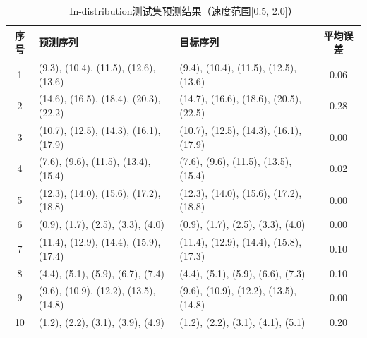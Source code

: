 \documentclass[a4paper, 12pt]{article}
\begin{document}
\begin{table}[!h]
    \centering
    \caption{In-distribution测试集预测结果（速度范围[0.5, 2.0]）}
    \label{tab:in_dist_results}
    \small
    \begin{tabular}{|c|l|l|c|}
        \hline
        \textbf{序号} & \textbf{预测序列} & \textbf{目标序列} & \textbf{平均误差} \\
        \hline
        1 & (9.3), (10.4), (11.5), (12.6), (13.6) & (9.4), (10.4), (11.5), (12.5), (13.6) & 0.06 \\
        2 & (14.6), (16.5), (18.4), (20.3), (22.2) & (14.7), (16.6), (18.6), (20.5), (22.5) & 0.28 \\
        3 & (10.7), (12.5), (14.3), (16.1), (17.9) & (10.7), (12.5), (14.3), (16.1), (17.9) & 0.00 \\
        4 & (7.6), (9.6), (11.5), (13.4), (15.4) & (7.6), (9.6), (11.5), (13.5), (15.4) & 0.02 \\
        5 & (12.3), (14.0), (15.6), (17.2), (18.8) & (12.3), (14.0), (15.6), (17.2), (18.8) & 0.00 \\
        6 & (0.9), (1.7), (2.5), (3.3), (4.0) & (0.9), (1.7), (2.5), (3.3), (4.0) & 0.00 \\
        7 & (11.4), (12.9), (14.4), (15.9), (17.4) & (11.4), (12.9), (14.4), (15.8), (17.3) & 0.10 \\
        8 & (4.4), (5.1), (5.9), (6.7), (7.4) & (4.4), (5.1), (5.9), (6.6), (7.3) & 0.10 \\
        9 & (9.6), (10.9), (12.2), (13.5), (14.8) & (9.6), (10.9), (12.2), (13.5), (14.8) & 0.00 \\
        10 & (1.2), (2.2), (3.1), (3.9), (4.9) & (1.2), (2.2), (3.1), (4.1), (5.1) & 0.20 \\
        \hline
    \end{tabular}
\end{table}
\end{document}
